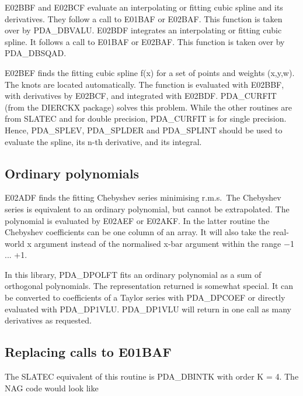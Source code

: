 \documentclass[11pt,twoside]{article}
\newcommand{\htmlref}[2]{#1}
\newcommand{\xlabel}[1]{}
\begin{document}
   E02BBF and E02BCF evaluate an interpolating or fitting cubic spline
   and its derivatives. They follow a call to E01BAF or E02BAF. 
   This function is taken over by PDA\_DBVALU. 
   E02BDF integrates an interpolating or fitting cubic spline. It
   follows a call to E01BAF or E02BAF. This function is taken over by
   PDA\_DBSQAD.

   E02BEF finds the fitting cubic spline f(x) for a set of points and
   weights (x,y,w). The knots are located automatically. The function is
   evaluated with E02BBF, with derivatives by E02BCF, and integrated
   with E02BDF. PDA\_CURFIT (from the DIERCKX package) solves this problem.
   While the other routines are from SLATEC and for double precision,
   PDA\_CURFIT is for single precision. Hence, PDA\_SPLEV, PDA\_SPLDER
   and PDA\_SPLINT should be used to evaluate the spline, its n-th derivative,
   and its integral. 


\subsection{\xlabel{ordinary_polynomials}Ordinary polynomials}

   E02ADF finds the fitting Chebyshev series minimising r.m.s.\ The
   Chebyshev series is equivalent to an ordinary polynomial, but cannot
   be extrapolated. The
   polynomial is evaluated by E02AEF or E02AKF. In the latter
   routine the Chebyshev coefficients can be one column of an array.
   It will also take the real-world x argument instead of the normalised
   x-bar argument within the range $-$1 ... +1.

   In this library, PDA\_DPOLFT fits an ordinary polynomial as a sum of
   orthogonal polynomials. The representation returned is somewhat
   special. It can be converted to coefficients of a Taylor series with
   PDA\_DPCOEF or directly evaluated with PDA\_DP1VLU. PDA\_DP1VLU will
   return in one call as many derivatives as requested.


\subsection{\xlabel{replacing_calls_to_e01baf}\label{m_e01baf}Replacing calls to E01BAF}

   The SLATEC equivalent of this routine is
\htmlref{PDA\_DBINTK}{PDA\_DBINTK}
   with order K = 4. The NAG code would look like
\end{document}
